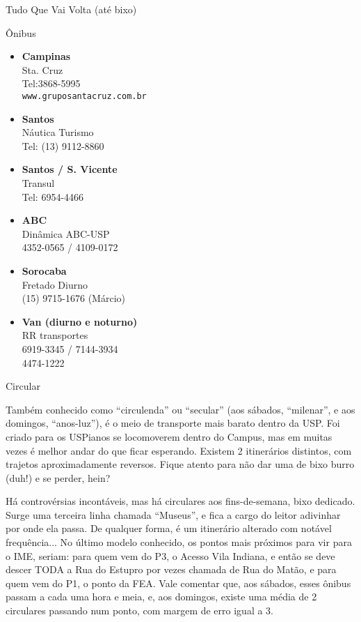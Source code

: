 \begin{secao}{Tudo Que Vai Volta (até bixo)}
\begin{subsecao}{Ônibus}
\begin{itemize}
  \item {\bf Campinas}\\
    Sta. Cruz\\
    Tel:3868-5995\\
    {\tt www.gruposantacruz.com.br}

  \item {\bf Santos}\\
    Náutica Turismo\\
    Tel: (13) 9112-8860

  \item {\bf Santos / S. Vicente}\\
    Transul\\
    Tel: 6954-4466

  \item {\bf ABC}\\
    Dinâmica ABC-USP\\
    4352-0565 / 4109-0172

  \item {\bf Sorocaba}\\
    Fretado Diurno\\
    (15) 9715-1676 (Márcio)

  \item {\bf Van (diurno e noturno)}\\
    RR transportes\\
    6919-3345 / 7144-3934\\
    4474-1222 \\

\end{itemize}

\end{subsecao}

\begin{subsecao}{Circular}

Também conhecido como ``circulenda'' ou ``secular'' (aos sábados, ``milenar'', e aos domingos, ``anos-luz''), é o meio de transporte mais barato dentro da USP. Foi criado para os USPianos se locomoverem dentro do Campus, mas em muitas vezes é melhor andar do que ficar esperando. Existem 2 itinerários distintos, com trajetos aproximadamente reversos. Fique atento para não dar uma de bixo burro (duh!) e se perder, hein? 

Há controvérsias incontáveis, mas há circulares aos fins-de-semana, bixo dedicado. Surge uma terceira linha chamada “Museus”, e fica a cargo do leitor adivinhar por onde ela passa. De qualquer forma, é um itinerário alterado com notável frequência... No último modelo conhecido, os pontos mais próximos para vir para o IME, seriam: para quem vem do P3, o Acesso Vila Indiana, e então se deve descer TODA a Rua do Estupro por vezes chamada de Rua do Matão, e para quem vem do P1, o ponto da FEA. Vale comentar que, aos sábados, esses ônibus passam a cada uma hora e meia, e, aos domingos, existe uma média de 2 circulares passando num ponto, com margem de erro igual a 3. 


\end{subsecao}
\end{secao}
